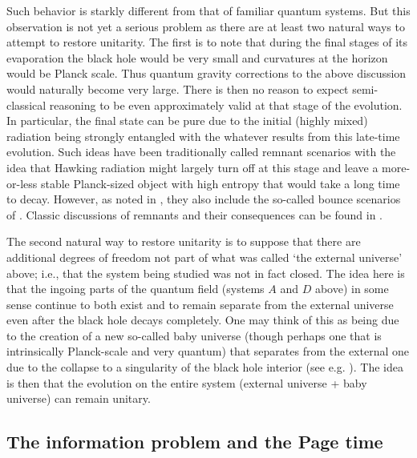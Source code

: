 \documentclass[10pt]{article}
\begin{document}
Such behavior is starkly different from that of familiar quantum systems. But this observation is not yet a serious problem as there are at least two natural ways to attempt to restore unitarity.  The first is to note that during the final stages of its evaporation the black hole would be very small and curvatures at the horizon would be Planck scale.  Thus quantum gravity corrections to the above discussion would naturally become very large.  There is then no reason to expect semi-classical reasoning to be even approximately valid at that stage of the evolution.  In particular, the final state can be pure due to the initial (highly mixed) radiation being strongly entangled with the whatever results from this late-time evolution.  Such ideas have been traditionally called remnant scenarios \cite{Hawking:1982dj} with the idea that Hawking radiation might largely turn off at this stage and leave a more-or-less stable Planck-sized object with high entropy that would take a long time to decay.  However, as noted in \cite{Almheiri:2013wka}, they also include the so-called bounce scenarios of \cite{Ashtekar:2008jd,Ashtekar:2010hx,Ashtekar:2010qz}.  Classic discussions of remnants and their consequences can be found in \cite{Giddings:1993km,Giddings:1994qt}.

The second natural way to restore unitarity is to suppose that there are additional degrees of freedom not part of what was called `the external universe' above; i.e., that the system being studied was not in fact closed.  The idea here is that the ingoing parts of the quantum field (systems $A$ and $D$ above) in some sense continue to both exist and to remain separate from the external universe even after the black hole decays completely.  One may think of this as being due to the creation of a new so-called baby universe (though perhaps one that is intrinsically Planck-scale and very quantum) that separates from the external one due to the collapse to a singularity of the black hole interior (see e.g. \cite{Markov:1984ii}).  The idea is then that the evolution on the entire system (external universe + baby universe) can remain unitary.

\subsection{The information problem and the Page time}
\label{Page}
\end{document}
